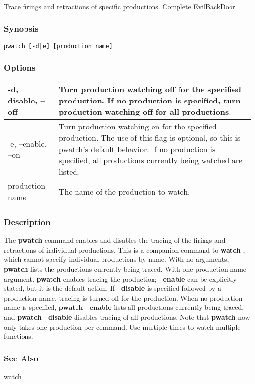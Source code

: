 \subsection{}
\label{pwatch}
Trace firings and retractions of specific productions. 
 Complete EvilBackDoor
\subsubsection*{Synopsis}
\begin{verbatim}
pwatch [-d|e] [production name]
\end{verbatim}
\subsubsection*{Options}
\begin{tabular}{|l|l|}
\hline 
 -d, --disable, --off  & Turn production watching off for the specified production. If no production is specified, turn production watching off for all productions.  \\
 \hline 
 -e, --enable, --on  & Turn production watching on for the specified production. The use of this flag is optional, so this is pwatch's default behavior. If no production is specified, all productions currently being watched are listed.  \\
 \hline 
production name & The name of the production to watch.  \\
 \hline 
\end{tabular}
\subsubsection*{Description}
 The \textbf{pwatch}
 command enables and disables the tracing of the firings and retractions of individual productions. This is a companion command to \textbf{watch}
, which cannot specify individual productions by name. 
 With no arguments, \textbf{pwatch}
 lists the productions currently being traced. With one production-name argument, \textbf{pwatch}
 enables tracing the production; \textbf{--enable}
 can be explicitly stated, but it is the default action. 
 If \textbf{--disable}
 is specified followed by a production-name, tracing is turned off for the production. When no production-name is specified, \textbf{pwatch --enable}
 lists all productions currently being traced, and \textbf{pwatch --disable}
 disables tracing of all productions. 
 Note that \textbf{pwatch}
 now only takes one production per command. Use multiple times to watch multiple functions. 
\subsubsection*{See Also}
\hyperref[watch]{watch} 